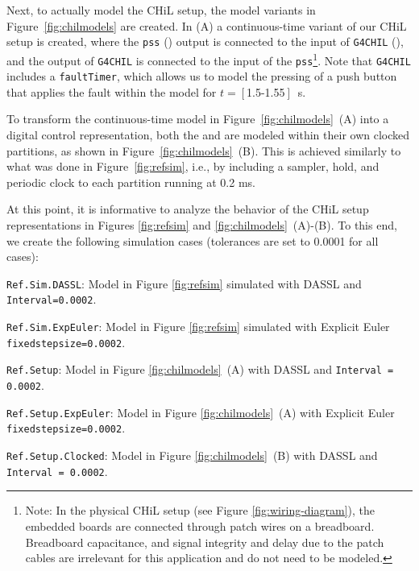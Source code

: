 Next, to actually model the CHiL setup, the model variants in Figure~\ref{fig:chilmodels} are created. In (A) a continuous-time variant of our CHiL setup is created, where the \texttt{pss} (\controller{}) output is connected to the input of \texttt{G4CHIL} (\plant{}), and the output of \texttt{G4CHIL} is connected to the input of the \texttt{pss}\footnote{Note: In the physical CHiL setup (see Figure \ref{fig:wiring-diagram}), the embedded boards are connected through patch wires on a breadboard. Breadboard capacitance, and signal integrity and delay due to the patch cables are irrelevant for this application and do not need to be modeled.}. Note that \texttt{G4CHIL} includes a \texttt{faultTimer}, which allows us to model the pressing of a push button that applies the fault within the model for $t=\left[\right.$1.5-1.55$\left.\right]$~s.

To transform the continuous-time model in Figure~\ref{fig:chilmodels}~(A) into a digital control representation, both the \controller{} and \plant{} are modeled within their own clocked partitions, as shown in Figure~\ref{fig:chilmodels}~(B). This is achieved similarly to what was done in Figure~\ref{fig:refsim}, i.e., by including a sampler, hold, and periodic clock to each partition running at 0.2 ms.

At this point, it is informative to analyze the behavior of the CHiL setup representations in Figures \ref{fig:refsim} and \ref{fig:chilmodels}~(A)-(B). To this end, we create the following simulation cases (tolerances are set to 0.0001 for all cases):

\squishlist
    \item[1.] \texttt{Ref.Sim.DASSL}: Model in Figure \ref{fig:refsim} simulated with DASSL and \texttt{Interval=0.0002}.
    \item[2.] \texttt{Ref.Sim.ExpEuler}: Model in Figure \ref{fig:refsim} simulated with Explicit Euler \texttt{fixedstepsize=0.0002}.
    \item[3.] \texttt{Ref.Setup}: Model in Figure \ref{fig:chilmodels}~(A) with DASSL and \texttt{Interval = 0.0002}.
    \item[4.] \texttt{Ref.Setup.ExpEuler}: Model in Figure \ref{fig:chilmodels}~(A) with Explicit Euler \texttt{fixedstepsize=0.0002}.
    \item[5.] \texttt{Ref.Setup.Clocked}: Model in Figure \ref{fig:chilmodels}~(B) with DASSL and \texttt{Interval = 0.0002}.
\squishend

